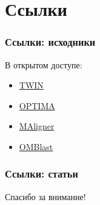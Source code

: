 \documentclass{beamer}
\begin{document}
\section{Ссылки}
\begin{frame}
\frametitle{Ссылки: исходники}
В открытом доступе:
\begin{itemize}
  \item \href{http://www.cs.colostate.edu/twin/download.html}{TWIN}
  \item \href{https://github.com/verznet/OPTIMA}{OPTIMA}
  \item \href{https://github.com/LeeMendelowitz/maligner}{MAligner}
  \item \href{https://github.com/aldenleung/OMBlast}{OMBlast}
\end{itemize}
\end{frame}

\begin{frame}[t,allowframebreaks]
\frametitle{Ссылки: статьи}
\printbibliography
\end{frame}

\begin{frame}

\begin{center}
\Huge Спасибо за внимание!
\end{center}

\end{frame}
\end{document}
